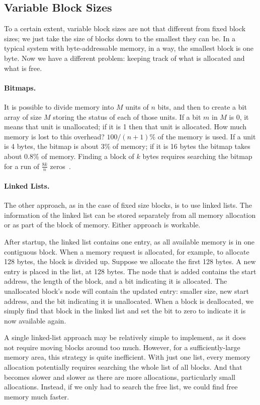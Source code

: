 \subsection*{Variable Block Sizes}
To a certain extent, variable block sizes are not that different from fixed block sizes; we just take the size of blocks down to the smallest they can be. In a typical system with byte-addressable memory, in a way, the smallest block is one byte. Now we have a different problem: keeping track of what is allocated and what is free.

\paragraph{Bitmaps.} It is possible to divide memory into $M$ units of $n$ bits, and then to create a bit array of size $M$ storing the status of each of those units. If a bit $m$ in $M$ is 0, it means that unit is unallocated; if it is 1 then that unit is allocated. How much memory is lost to this overhead? $100/(n+1)$\% of the memory is used. If a unit is 4 bytes, the bitmap is about 3\% of memory; if it is 16 bytes the bitmap takes about 0.8\% of memory. Finding a block of $k$ bytes requires searching the bitmap for a run of $\frac{8k}{n}$ zeros~\cite{mte241}.

\paragraph{Linked Lists.}
The other approach, as in the case of fixed size blocks, is to use linked lists. The information of the linked list can be stored separately from all memory allocation or as part of the block of memory. Either approach is workable.

After startup, the linked list contains one entry, as all available memory is in one contiguous block. When a memory request is allocated, for example, to allocate 128 bytes, the block is divided up. Suppose we allocate the first 128 bytes. A new entry is placed in the list, at 128 bytes. The node that is added contains the start address, the length of the block, and a bit indicating it is allocated. The unallocated block's node will contain the updated entry: smaller size, new start address, and the bit indicating it is unallocated. When a block is deallocated, we simply find that block in the linked list and set the bit to zero to indicate it is now available again.

A single linked-list approach may be relatively simple to implement, as it does not require moving blocks around too much. However, for a sufficiently-large memory area, this strategy is quite inefficient. With just one list, every memory allocation potentially requires searching the whole list of all blocks. And that becomes slower and slower as there are more allocations, particularly small allocations. Instead, if we only had to search the free list, we could find free memory much faster.

